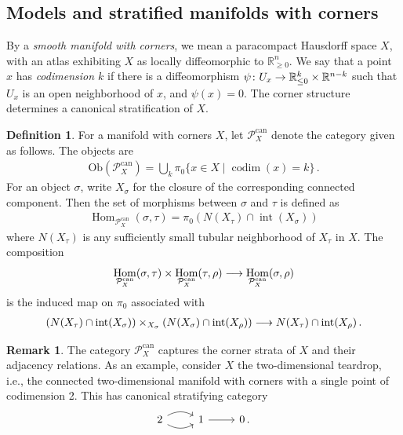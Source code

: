 \documentclass[10pt]{amsart}
\numberwithin{equation}{section}
\theoremstyle{definition}
\newtheorem{definition}[prop]{Definition}
\newtheorem{rem}[prop]{Remark}
\DeclareMathOperator{\Hom}{Hom}
\DeclareMathOperator{\interior}{int}
\DeclareMathOperator{\codim}{codim}
\DeclareMathOperator{\can}{can}
\newcommand{\bR}{\mathbb{R}}
\newcommand{\cP}{\mathcal{P}}
\renewcommand{\to}{\mathchoice{\longrightarrow}{\rightarrow}{}{}}
\begin{document}
\subsection{Models and stratified manifolds with corners}\label{subsec:models_and_stratified}

By a \emph{smooth manifold with corners}, we mean a paracompact Hausdorff space $X$, with an atlas exhibiting $X$ as locally diffeomorphic to $\bR_{\geq 0}^{n}$.
We say that a point $x$ has \emph{codimension $k$} if there is a diffeomorphism $\psi\colon U_x \to \bR_{\leq 0}^{k} \times \bR^{n-k}$ such that $U_x$ is an open neighborhood of $x$, and $\psi(x)=0$.
The corner structure determines a canonical stratification of $X$.

\begin{definition}\label{def:P^Can}
	For a manifold with corners $X$, let $\cP_X^{\can}$ denote the category given as follows.
	The objects are
	\begin{align*}
		\mathrm{Ob}(\cP_X^{\can}) = \bigcup_k \pi_0\{x\in X \mid \codim(x) =k \} \,.
	\end{align*}
	For an object $\sigma$, write $X_\sigma$ for the closure of the corresponding connected component.
	Then the set of morphisms between $\sigma$ and $\tau$ is defined as
	\begin{align*}
		\Hom_{\cP_X^{\can}}(\sigma, \tau) = \pi_0\left(N(X_\tau) \cap \interior(X_\sigma)\right)
	\end{align*}
	where $N(X_{\tau})$ is any sufficiently small tubular neighborhood of $X_{\tau}$ in $X$.
	The composition
	\[
	\Hom_{\cP_X^{\can}}(\sigma, \tau) \times \Hom_{\cP_X^{\can}}(\tau, \rho) \to \Hom_{\cP_X^{\can}}(\sigma, \rho)
	\]
	is the induced map on $\pi_0$ associated with
	\begin{align*}
		\left(N(X_\tau)\cap \interior( X_{\sigma}) \right) \times_{X_\sigma} \left(N(X_\sigma ) \cap \interior(X_\rho) \right) \to N(X_\tau)\cap \interior(X_\rho) \,.
	\end{align*}
\end{definition}
\begin{rem}
	The category $\cP_{X}^{\can}$ captures the corner strata of $X$ and their adjacency relations.
  As an example, consider $X$ the two-dimensional teardrop, i.e., the connected two-dimensional manifold with corners with a single point of codimension 2.
  This has canonical stratifying category
	\begin{equation*}
		\begin{tikzcd}
			2 \arrow[r,bend left] \arrow[r, bend right] & 1 \arrow[r] & 0 \,.
		\end{tikzcd}
	\end{equation*}
\end{rem}
\end{document}
